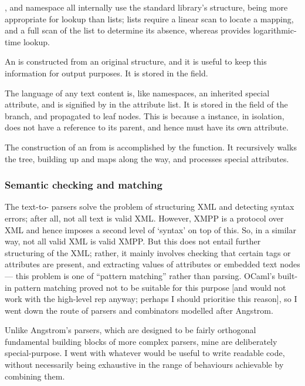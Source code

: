 \documentclass[12pt,a4paper,twoside,openright]{report}
\begin{document}
{,  and namespace all internally use the standard library's  structure, being more appropriate for lookup than lists; lists require a linear scan to locate a mapping, and a full scan of the list to determine its absence, whereas  provides logarithmic-time lookup.

An  is constructed from an original  structure, and it is useful to keep this information for output purposes. It is stored in the  field.

The language of any text content is, like namespaces, an inherited special attribute, and is signified by  in the attribute list. It is stored in the  field of the branch, and propagated to leaf  nodes. This is because a  instance, in isolation, does not have a reference to its parent, and hence must have its own  attribute.

The construction of an  from  is accomplished by the  function. It recursively walks the tree, building up  and  maps along the way, and processes special attributes.

\subsubsection{Semantic checking and matching} \label{sec:matchers}
The text-to- parsers solve the problem of structuring XML and detecting syntax errors; after all, not all text is valid XML. However, XMPP is a protocol over XML and hence imposes a second level of `syntax' on top of this. So, in a similar way, not all valid XML is valid XMPP. But this does not entail further structuring of the XML; rather, it mainly involves checking that certain tags or attributes are present, and extracting values of attributes or embedded text nodes --- this problem is one of ``pattern matching'' rather than parsing. OCaml's built-in pattern matching proved not to be suitable for this purpose [and would not work with the high-level rep anyway; perhaps I should prioritise this reason], so I went down the route of parsers and combinators modelled after Angstrom.

Unlike Angstrom's parsers, which are designed to be fairly orthogonal fundamental building blocks of more complex parsers, mine are deliberately special-purpose. I went with whatever would be useful to write readable code, without necessarily being exhaustive in the range of behaviours achievable by combining them.

}
\end{document}
